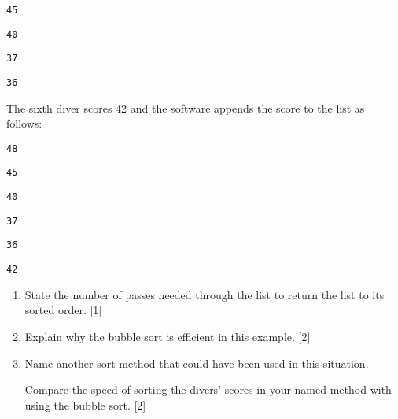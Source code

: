 \begin{enumerate}
\texttt{45 }

\texttt{40 }

\texttt{37 }

\texttt{36 }

The sixth diver scores 42 and the software appends the score to the
list as follows: 

\texttt{48 }

\texttt{45 }

\texttt{40 }

\texttt{37 }

\texttt{36 }

\texttt{42}
\begin{enumerate}
\item State the number of passes needed through the list to return the list
to its sorted order. \hfill{}{[}1{]}
\item Explain why the bubble sort is efficient in this example. \hfill{}{[}2{]}
\item Name another sort method that could have been used in this situation. 

Compare the speed of sorting the divers\textquoteright{} scores in
your named method with using the bubble sort. \hfill{}{[}2{]}
\end{enumerate}
\end{enumerate}